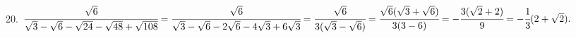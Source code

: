 20. $\cfrac{\sqrt{6}}{\sqrt{3}-\sqrt{6}-\sqrt{24}-\sqrt{48}+\sqrt{108}}=\cfrac{\sqrt{6}}{\sqrt{3}-\sqrt{6}-2\sqrt{6}-4\sqrt{3}+6\sqrt{3}}=
\cfrac{\sqrt{6}}{3(\sqrt{3}-\sqrt{6})}=\cfrac{\sqrt{6}(\sqrt{3}+\sqrt{6})}{3(3-6)}=
-\cfrac{3(\sqrt{2}+2)}{9}=-\cfrac{1}{3}(2+\sqrt{2}).$\\
